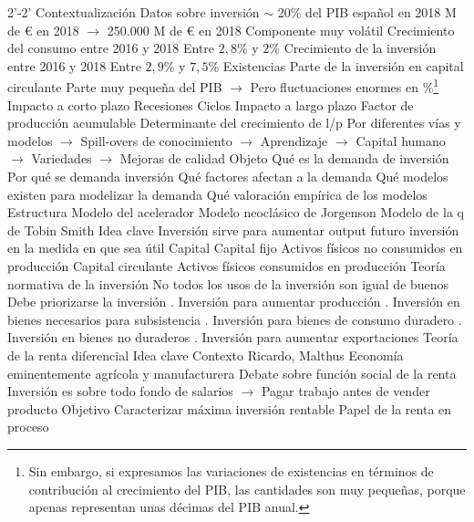 \documentclass{nuevotema}
\begin{document}
\begin{esquemal}
	\1[]  2'-2'
		\2 Contextualización
			\3 Datos sobre inversión
				\4 $\sim$ 20\% del PIB español en 2018
				 M de € en 2018
				\4[] $\to$ 250.000 M de € en 2018
				\4 Componente muy volátil
				\4 Crecimiento del consumo entre 2016 y 2018
				\4[] Entre $2,8\%$ y $2\%$
				\4 Crecimiento de la inversión entre 2016 y 2018
				\4[] Entre $2,9\%$ y $7,5\%$
				\4 Existencias
				\4[] Parte de la inversión en capital circulante
				\4[] Parte muy pequeña del PIB
				\4[] $\to$ Pero fluctuaciones enormes en $\%$\footnote{Sin embargo, si expresamos las variaciones de existencias en términos de contribución al crecimiento del PIB, las cantidades son muy pequeñas, porque apenas representan unas décimas del PIB anual.}
			\3 Impacto a corto plazo
				\4 Recesiones
				\4 Ciclos
			\3 Impacto a largo plazo
				\4 Factor de producción acumulable
				\4 Determinante del crecimiento de l/p
				\4[] Por diferentes vías y modelos
				\4[] $\to$ Spill-overs de conocimiento
				\4[] $\to$ Aprendizaje
				\4[] $\to$ Capital humano
				\4[] $\to$ Variedades
				\4[] $\to$ Mejoras de calidad
		\2 Objeto
			\3 Qué es la demanda de inversión
			\3 Por qué se demanda inversión
			\3 Qué factores afectan a la demanda
			\3 Qué modelos existen para modelizar la demanda
			\3 Qué valoración empírica de los modelos
		\2 Estructura
			\3 Modelo del acelerador
			\3 Modelo neoclásico de Jorgenson
			\3 Modelo de la q de Tobin
	\1 
		\2 Smith
			\3 Idea clave
				\4 Inversión sirve para aumentar output futuro
				\4 inversión en la medida en que sea útil
			\3 Capital
			\3 Capital fijo
				\4[] Activos físicos no consumidos en producción
			\3 Capital circulante
				\4[] Activos físicos consumidos en producción
			\3 Teoría normativa de la inversión
				\4 No todos los usos de la inversión son igual de buenos
				\4 Debe priorizarse la inversión
				. Inversión para aumentar producción
				. Inversión en bienes necesarios para subsistencia
				. Inversión para bienes de consumo duradero
				. Inversión en bienes no duraderos
				. Inversión para aumentar exportaciones
		\2 Teoría de la renta diferencial
			\3 Idea clave
				\4 Contexto
				\4[] Ricardo, Malthus
				\4[] Economía eminentemente agrícola y manufacturera
				\4[] Debate sobre función social de la renta
				\4[] Inversión es sobre todo fondo de salarios
				\4[] $\to$ Pagar trabajo antes de vender producto
				\4 Objetivo
				\4[] Caracterizar máxima inversión rentable
				\4[] Papel de la renta en proceso

\end{esquemal}
\end{document}
